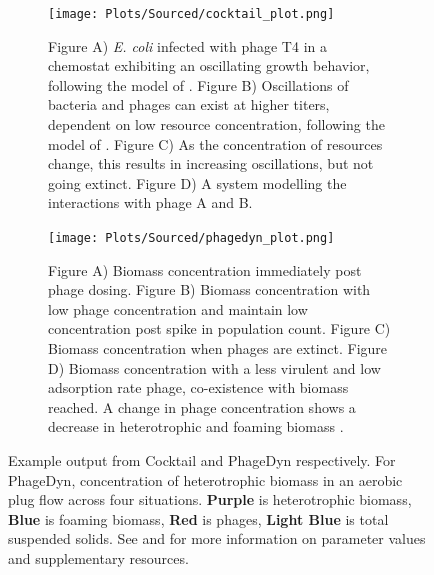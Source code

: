 \begin{figure}[h!]
    \centering
    \begin{subfigure}{0.49\linewidth}
        \centering
        \captionsetup{width=1\linewidth}
        \texttt{[image: Plots/Sourced/cocktail\_plot.png]}
        \caption{
            Figure A) \textit{E. coli} infected with phage T4 in a chemostat exhibiting an oscillating growth behavior, following the model of \citet{bohannanEffectResourceEnrichment1997}. 
            Figure B) Oscillations of bacteria and phages can exist at higher titers, dependent on low resource concentration, following the model of \citet{lenskiDynamicsInteractionsBacteria1988}. 
            Figure C) As the concentration of resources change, this results in increasing oscillations, but not going extinct. 
            Figure D) A system modelling the interactions with phage A and B. 
        }
        \label{fig:cocktail_software_output}
    \end{subfigure}
    \hfill
    \begin{subfigure}{0.49\linewidth}
        \centering
        \captionsetup{width=1\linewidth}
        \texttt{[image: Plots/Sourced/phagedyn\_plot.png]}
        \caption{
            Figure A) Biomass concentration immediately post phage dosing. 
            Figure B) Biomass concentration with low phage concentration and maintain low concentration post spike in population count. 
            Figure C) Biomass concentration when phages are extinct. 
            Figure D) Biomass concentration with a less virulent and low adsorption rate phage, co-existence with biomass reached. 
            A change in phage concentration shows a decrease in heterotrophic and foaming biomass \cite{krysiak-baltynSimulationPhageDynamics2017}. 
        }
        \label{fig:PhageDyn_software_output}
    \end{subfigure}
    \caption{Example output from Cocktail and PhageDyn respectively. For PhageDyn, concentration of heterotrophic biomass in an aerobic plug flow across four situations.
            \textcolor[HTML]{551A8C}{\textbf{Purple}} is heterotrophic biomass, 
            \textcolor[HTML]{4580B4}{\textbf{Blue}} is foaming biomass, 
            \textcolor[HTML]{FF0000}{\textbf{Red}} is phages, 
            \textcolor[HTML]{01E6EE}{\textbf{Light Blue}} is total suspended solids. 
            See \citet{nilssonCocktailComputerProgram2022} and \cite{krysiak-baltynSimulationPhageDynamics2017} for more information on parameter values and supplementary resources. }
\end{figure}


